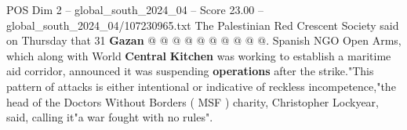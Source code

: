 \begin{textsample}{POS Dim 2 – global\_south\_2024\_04 – Score 23.00 – global\_south\_2024\_04/107230965.txt}
The Palestinian Red Crescent Society said on Thursday that 31 \textbf{Gazan} @ @ @ @ @ @ @ @ @ @.
Spanish NGO Open Arms, which along with World \textbf{Central} \textbf{Kitchen} was working to establish a maritime aid corridor, announced it was suspending \textbf{operations} after the strike."This pattern of attacks is either intentional or indicative of reckless incompetence,"the head of the Doctors Without Borders ( MSF ) charity, Christopher Lockyear, said, calling it"a war fought with no rules".

\end{textsample}

